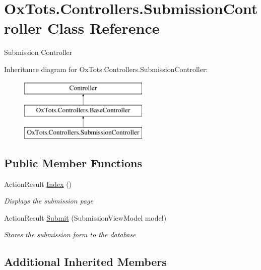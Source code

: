 \hypertarget{class_ox_tots_1_1_controllers_1_1_submission_controller}{}\section{Ox\+Tots.\+Controllers.\+Submission\+Controller Class Reference}
\label{class_ox_tots_1_1_controllers_1_1_submission_controller}


Submission Controller  


Inheritance diagram for Ox\+Tots.\+Controllers.\+Submission\+Controller\+:\begin{figure}[H]
\begin{center}
\leavevmode
\includegraphics[height=3.000000cm]{class_ox_tots_1_1_controllers_1_1_submission_controller}
\end{center}
\end{figure}
\subsection*{Public Member Functions}
\begin{DoxyCompactItemize}
\item 
Action\+Result \mbox{\hyperlink{class_ox_tots_1_1_controllers_1_1_submission_controller_ad2b361daf030c0f94b6a001590369e8f}{Index}} ()
\begin{DoxyCompactList}\small\item\em Displays the submission page \end{DoxyCompactList}\item 
Action\+Result \mbox{\hyperlink{class_ox_tots_1_1_controllers_1_1_submission_controller_a09a4165e1d7eee949170f6302ee90b4c}{Submit}} (Submission\+View\+Model model)
\begin{DoxyCompactList}\small\item\em Stores the submission form to the database \end{DoxyCompactList}\end{DoxyCompactItemize}
\subsection*{Additional Inherited Members}


